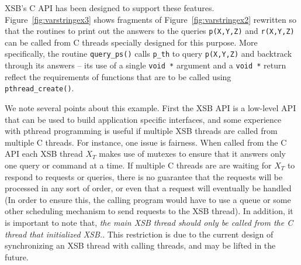 XSB's C API has been designed to support these features.
Figure~\ref{fig:varstringex3} shows fragments of
Figure~\ref{fig:varstringex2} rewritten so that the routines to print
out the answers to the queries {\tt p(X,Y,Z)} and {\tt r(X,Y,Z)} can
be called from C threads specially designed for this purpose.  More
specifically, the routine {\tt query\_ps()} calls {\tt p\_th} to query
{\tt p(X,Y,Z)} and backtrack through its answers -- its use of a
single {\tt void *} argument and a {\tt void *} return reflect the
requirements of functions that are to be called using {\tt
  pthread\_create()}.

We note several points about this example.  First the XSB API is a
low-level API that can be used to build application specific
interfaces, and some experience with pthread programming is useful if
multiple XSB threads are called from multiple C threads.  For
instance, one issue is fairness.  When called from the C API each XSB
thread $X_T$ makes use of mutexes to ensure that it answers only one
query or command at a time.  If multiple C threads are are waiting for
$X_T$ to respond to requests or queries, there is no guarantee that
the requests will be processed in any sort of order, or even that a
request will eventually be handled (In order to ensure this, the
calling program would have to use a queue or some other scheduling
mechanism to send requests to the XSB thread).  In addition, it is
important to note that, {\em the main XSB thread should only be called
  from the C thread that initialized XSB.}.  This restriction is due
to the current design of synchronizing an XSB thread with calling
threads, and may be lifted in the future.

